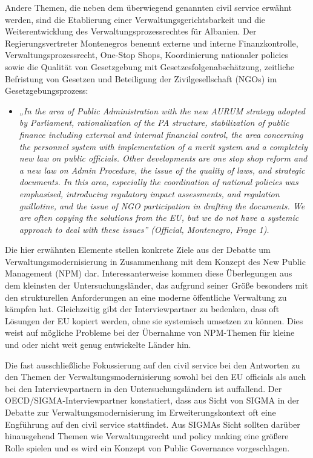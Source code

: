 Andere Themen, die neben dem überwiegend genannten civil service erwähnt werden, sind die Etablierung einer Verwaltungsgerichtsbarkeit und die Weiterentwicklung des Verwaltungsprozessrechtes für Albanien. Der Regierungsvertreter Montenegros benennt externe und interne Finanzkontrolle, Verwaltungsprozessrecht, One-Stop Shops, Koordinierung nationaler policies sowie die Qualität von Gesetzgebung mit Gesetzesfolgenabschätzung, zeitliche Befristung von Gesetzen und Beteiligung der Zivilgesellschaft (NGOs) im Gesetzgebungsprozess:
\begin{itemize}[label={}]
\item \textit{„In the area of Public Administration with the new AURUM strategy adopted by Parliament, rationalization of the PA structure, stabilization of public finance including external and internal financial control, the area concerning the personnel system with implementation of a merit system and a completely new law on public officials. Other developments are one stop shop reform and a new law on Admin Procedure, the issue of the quality of laws, and strategic documents. In this area, especially the coordination of national policies was emphasised, introducing regulatory impact assessments, and regulation guillotine, and the issue of NGO participation in drafting the documents. We are often copying the solutions from the EU, but we do not have a systemic approach to deal with these issues” (Official, Montenegro, Frage 1).}
\end{itemize}
Die hier erwähnten Elemente stellen konkrete Ziele aus der Debatte um Verwaltungsmodernisierung in Zusammenhang mit dem Konzept des New Public Management (NPM) dar. Interessanterweise kommen diese Überlegungen aus dem kleinsten der Untersuchungsländer, das aufgrund seiner Größe besonders mit den strukturellen Anforderungen an eine moderne öffentliche Verwaltung zu kämpfen hat. Gleichzeitig gibt der Interviewpartner zu bedenken, dass oft Lösungen der EU kopiert werden, ohne sie systemisch umsetzen zu können. Dies weist auf mögliche Probleme bei der Übernahme von NPM-Themen für kleine und oder nicht weit genug entwickelte Länder hin.\par
Die fast ausschließliche Fokussierung auf den civil service bei den Antworten zu den Themen der Verwaltungsmodernisierung sowohl bei den EU officials als auch bei den Interviewpartnern in den Untersuchungsländern ist auffallend. Der OECD/SIGMA-Interviewpartner konstatiert, dass aus Sicht von SIGMA in der Debatte zur Verwaltungsmodernisierung im Erweiterungskontext oft eine Engführung auf den civil service stattfindet. Aus SIGMAs Sicht sollten darüber hinausgehend Themen wie Verwaltungsrecht und policy making eine größere Rolle spielen und es wird ein Konzept von Public Governance vorgeschlagen.
